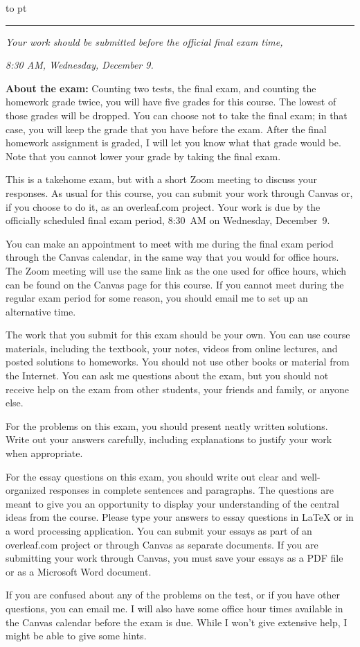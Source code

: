 \documentclass[12pt]{article}
\begin{document}
\hbox to 
\nointerlineskip
{} pt
\hrule
\bigskip

\centerline{\it Your work should be submitted before the official final exam time,}
\centerline{\it 8:30 AM, Wednesday, December 9.}

\bigskip

{\narrower

\textbf{About the exam:} Counting two tests, the final exam, and counting the homework grade
twice, you will have five grades for this course.  The lowest of those grades will be dropped.
You can choose not to take the final exam; in that case, you will keep the grade that you
have before the exam.  After the final homework assignment is graded, I will let you know
what that grade would be.  Note that you cannot lower your grade by taking the final exam.

This is a takehome exam, but with a short Zoom meeting to discuss your responses.
As usual for this course, you can submit your work through Canvas or, if you choose to
do it, as an overleaf.com project.  Your work is due by the officially scheduled final
exam period, 8:30~AM on Wednesday, December~9.

You can make an appointment to meet with me during the final exam period through the
Canvas calendar, in the same way that you would for office hours.  The Zoom meeting
will use the same link as the one used for office hours, which can be found on the
Canvas page for this course.  If you cannot meet during the regular exam period for
some reason, you should email me to set up an alternative time.

The work that you submit for this exam should be your own.  You can use
course materials, including the textbook, your notes, videos from online lectures,
and posted solutions to homeworks.  You should not use other books or material from
the Internet.   You can ask me questions about the
exam, but you should not receive help on the exam from
other students, your friends and family, or anyone else.

For the problems on this exam,  you should present neatly written solutions.
Write out your answers carefully, including explanations to justify your work when appropriate.

For the essay questions on this exam, you should write out clear and well-organized responses
in complete sentences and paragraphs.  The questions are meant to give you an opportunity to
display your understanding of the central ideas from the course.
Please type your answers to essay questions in LaTeX or in a word processing application.
You can submit your essays as part of an overleaf.com project or through Canvas as separate 
documents.  If you are submitting your work through Canvas, you must save your essays as a PDF 
file or as a Microsoft Word document.

If you are confused about any of the problems on the test, or if you have other
questions, you can email me.  I will also have some office hour times available in the
Canvas calendar before the exam is due. While I won't give extensive help, I might be able
to give some hints.  

}
\end{document}
